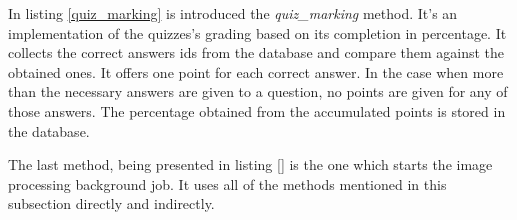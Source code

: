 

In listing \ref{quiz_marking} is introduced the \textit{quiz\_marking} method. It's an implementation of the quizzes's grading based on its completion in percentage. It collects the correct answers ids from the database and compare them against the obtained ones. It offers one point for each correct answer. In the case when more than the necessary answers are given to a question, no points are given for any of those answers. The percentage obtained from the accumulated points is stored in the database.





The last method, being presented in listing \ref{} is the one which starts the image processing background job. It uses all of the methods mentioned in this subsection directly and indirectly.




\clearpage